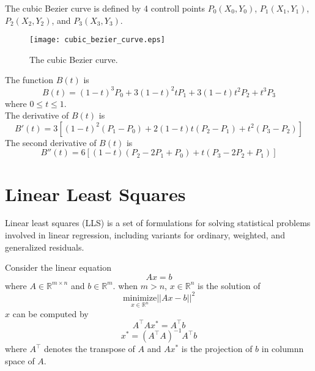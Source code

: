 \documentclass{turgon}
\begin{document}
\begin{flushleft}

The cubic Bezier curve is defined by 4 controll points $P_0(X_0, Y_0)$,
$P_1(X_1, Y_1)$, $P_2(X_2, Y_2)$, and $P_3(X_3, Y_3)$.
\begin{figure}[h]
    \centering
    \texttt{[image: cubic\_bezier\_curve.eps]}
    \caption{The cubic Bezier curve.}
    \label{fig:cubic_bezier_curve}
\end{figure}

\bigbreak
The function $B(t)$ is
\begin{equation}
    B(t) = (1-t)^3 P_0 + 3(1-t)^2 t P_1 + 3(1-t) t^2 P_2 + t^3 P_3
    \label{eq:cbc:der0}
\end{equation}
where $0 \leq t \leq 1$. \\
The derivative of $B(t)$ is
\begin{equation}
    B'(t) = 3[(1-t)^2 (P_1 - P_0) + 2(1-t)t(P_2 - P_1) + t^2(P_3 - P_2)]
\end{equation}
The second derivative of $B(t)$ is
\begin{equation}
    B''(t) = 6[(1-t)(P_2 - 2P_1 + P_0) + t(P_3 - 2P_2 + P_1)]
\end{equation}

\end{flushleft}

\chapter{Linear Least Squares}


\begin{flushleft}

Linear least squares (LLS) is a set of formulations for solving statistical
problems involved in linear regression, including variants for ordinary,
weighted, and generalized residuals.

\bigbreak
Consider the linear equation
\begin{equation}
    Ax = b
    \label{eq:lls:leq}
\end{equation}
where $A \in \mathbb{R}^{m \times n}$ and $b \in \mathbb{R}^m$. when $m>n$,
$x \in \mathbb{R}^n$ is the solution of
\begin{equation}
    \underset{x \in \mathbb{R}^n}{\text{minimize}} ||A x - b||^2
\end{equation}
$x$ can be computed by
\begin{equation}
    A^\top A x^* = A^\top b
\end{equation}
\begin{equation}
    x^* = (A^\top A)^{-1} A^\top b
    \label{eq:lls:sol}
\end{equation}
where $A^\top$ denotes the transpose of $A$ and $Ax^*$ is the projection of
$b$ in columnn space of $A$.

\end{flushleft}
\end{document}
